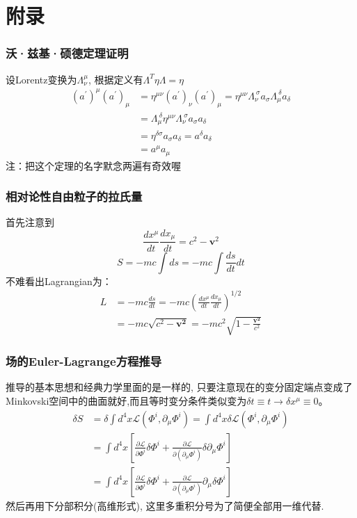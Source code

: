 \documentclass{whu-beamer}
\begin{document}
\section{附录}
\begin{frame}
  \frametitle{\alert{沃·兹基·硕德}定理证明}
  设Lorentz变换为$\Lambda^\mu_\nu$, 根据定义有$\Lambda^T\eta\Lambda=\eta$
  \begin{align*}
    (a^\prime)^\mu(a^\prime)_\mu&=\eta^{\mu\nu}(a^\prime)_\nu(a^\prime)_\mu=\eta^{\mu\nu}\Lambda^{\ \sigma}_{\nu} a_\sigma \Lambda^{\ \delta}_\mu a_\delta\\
    &=\Lambda^{\ \delta}_\mu \eta^{\mu\nu}\Lambda^{\ \sigma}_{\nu} a_\sigma a_\delta\\
    &=\eta^{\delta\sigma}a_\sigma a_\delta=a^\delta a_\delta\\
    &=a^\mu a_\mu
  \end{align*}
  \alert{注}：把这个定理的名字默念两遍有奇效喔~
\end{frame}
\begin{frame}
  \frametitle{相对论性自由粒子的拉氏量}
  首先注意到$$\frac{dx^\mu}{dt}\frac{dx_\mu}{dt}=c^2-\mathbf{v}^2$$
  \begin{equation*}
    S=-mc\int ds=-mc\int \frac{ds}{dt}dt
  \end{equation*}
  不难看出Lagrangian为：
  \begin{align*}
    L&=-mc\frac{ds}{dt}=-mc\left(\frac{dx^\mu}{dt}\frac{dx_\mu}{dt}\right)^{1/2}\\
    &=-mc\sqrt{c^2-\mathbf{v^2}}=-mc^2\sqrt{1-\frac{\mathbf{v^2}}{c^2}}
  \end{align*}
\end{frame}
\begin{frame}
  \frametitle{场的Euler-Lagrange方程推导}
  推导的基本思想和经典力学里面的是一样的, 只要注意现在的变分固定端点变成了Minkovski空间中的曲面就好,而且等时变分条件类似变为$\delta t\equiv t\to\delta x^\mu\equiv0$。
  \begin{align*}
    \delta S&=\delta\int d^4x\mathscr{L}(\Phi^i,\partial_\mu\Phi^i)=\int d^4x\delta\mathscr{L}(\Phi^i,\partial_\mu\Phi^i)\\
    &=\int d^4x\left[\frac{\partial\mathscr{L}}{\partial\Phi^i}\delta\Phi^i+\frac{\partial\mathscr{L}}{\partial(\partial_\mu\Phi^i)}\delta\partial_\mu\Phi^i\right]\\
    &=\int d^4x\left[\frac{\partial\mathscr{L}}{\partial\Phi^i}\delta\Phi^i+\frac{\partial\mathscr{L}}{\partial(\partial_\mu\Phi^i)}\partial_\mu\delta\Phi^i\right]
  \end{align*}
  然后再用下分部积分(高维形式), 这里多重积分号为了简便全部用一维代替.
\end{frame}
\end{document}
